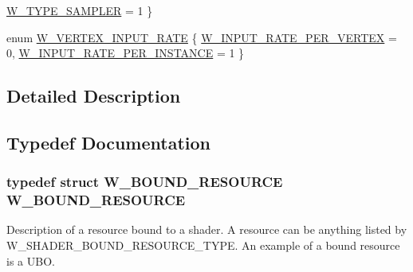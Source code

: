 \begin{DoxyCompactItemize}
\hyperlink{group__engineclass_gga6f7d88d2bbec56561a4b13c4e6604893a6e2bb9072511a82a2d31810554c22c8a}{W\+\_\+\+T\+Y\+P\+E\+\_\+\+S\+A\+M\+P\+L\+ER} = 1
 \}
\item 
enum \hyperlink{group__engineclass_gad9e5fe1880687bc445eec4c141324116}{W\+\_\+\+V\+E\+R\+T\+E\+X\+\_\+\+I\+N\+P\+U\+T\+\_\+\+R\+A\+TE} \{ \hyperlink{group__engineclass_ggad9e5fe1880687bc445eec4c141324116a6fca29ea21ed48a0deedb03a85b32b4d}{W\+\_\+\+I\+N\+P\+U\+T\+\_\+\+R\+A\+T\+E\+\_\+\+P\+E\+R\+\_\+\+V\+E\+R\+T\+EX} = 0, 
\hyperlink{group__engineclass_ggad9e5fe1880687bc445eec4c141324116ad23d31d0dd16491a624616d7f77de9bf}{W\+\_\+\+I\+N\+P\+U\+T\+\_\+\+R\+A\+T\+E\+\_\+\+P\+E\+R\+\_\+\+I\+N\+S\+T\+A\+N\+CE} = 1
 \}
\end{DoxyCompactItemize}


\subsection{Detailed Description}


\subsection{Typedef Documentation}
\subsubsection[{\texorpdfstring{W\+\_\+\+B\+O\+U\+N\+D\+\_\+\+R\+E\+S\+O\+U\+R\+CE}{W_BOUND_RESOURCE}}]{\setlength{\rightskip}{0pt plus 5cm}typedef struct {\bf W\+\_\+\+B\+O\+U\+N\+D\+\_\+\+R\+E\+S\+O\+U\+R\+CE}  {\bf W\+\_\+\+B\+O\+U\+N\+D\+\_\+\+R\+E\+S\+O\+U\+R\+CE}}\hypertarget{group__engineclass_gafbfee122f0f44bd16c3369f295e95aae}{}\label{group__engineclass_gafbfee122f0f44bd16c3369f295e95aae}
Description of a resource bound to a shader. A resource can be anything listed by W\+\_\+\+S\+H\+A\+D\+E\+R\+\_\+\+B\+O\+U\+N\+D\+\_\+\+R\+E\+S\+O\+U\+R\+C\+E\+\_\+\+T\+Y\+PE. An example of a bound resource is a U\+BO. 
